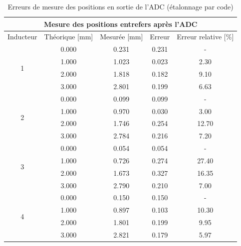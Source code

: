 \begin{table}[H]
    \centering
    \begin{tabular}{|c|c|c|c|c|}
        \hline
        \multicolumn{5}{|c|}{\textbf{Mesure des positions entrefers après l'ADC}}                      \\ \hline
        Inducteur          & Théorique {[}mm{]} & Mesurée {[}mm{]} & Erreur & Erreur relative {[}\%{]} \\ \hline
        \multirow{4}{*}{1} & 0.000              & 0.231            & 0.231  & -                        \\ \cline{2-5}
                           & 1.000              & 1.023            & 0.023  & 2.30                     \\ \cline{2-5}
                           & 2.000              & 1.818            & 0.182  & 9.10                     \\ \cline{2-5}
                           & 3.000              & 2.801            & 0.199  & 6.63                     \\ \hline
        \multirow{4}{*}{2} & 0.000              & 0.099            & 0.099  & -                        \\ \cline{2-5}
                           & 1.000              & 0.970            & 0.030  & 3.00                     \\ \cline{2-5}
                           & 2.000              & 1.746            & 0.254  & 12.70                    \\ \cline{2-5}
                           & 3.000              & 2.784            & 0.216  & 7.20                     \\ \hline
        \multirow{4}{*}{3} & 0.000              & 0.054            & 0.054  & -                        \\ \cline{2-5}
                           & 1.000              & 0.726            & 0.274  & 27.40                    \\ \cline{2-5}
                           & 2.000              & 1.673            & 0.327  & 16.35                    \\ \cline{2-5}
                           & 3.000              & 2.790            & 0.210  & 7.00                     \\ \hline
        \multirow{4}{*}{4} & 0.000              & 0.150            & 0.150  & -                        \\ \cline{2-5}
                           & 1.000              & 0.897            & 0.103  & 10.30                    \\ \cline{2-5}
                           & 2.000              & 1.801            & 0.199  & 9.95                     \\ \cline{2-5}
                           & 3.000              & 2.821            & 0.179  & 5.97                     \\ \hline
    \end{tabular}
    \caption{Erreurs de mesure des positions en sortie de l'ADC (étalonnage par code)}
    \label{tab:premier_etalonnage_code_adc}
\end{table}

